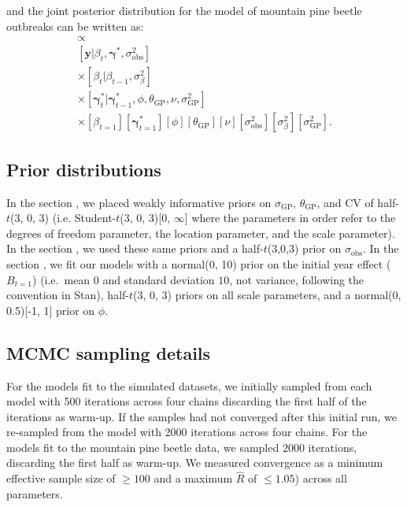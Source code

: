 \documentclass[12pt,english]{article}
\begin{document}
\begin{spacing}{1.4}
\noindent
and the joint posterior distribution
for the model of mountain pine beetle outbreaks can be written as:
\begin{multline}
  [
  \bm{\beta},
  \bm{\gamma}^*,
  \phi,
  \theta_{\mathrm{GP}},
  \nu,
  \sigma^2_{\mathrm{obs}},
  \sigma^2_{\beta},
  \sigma_{\mathrm{GP}}^2
  |
  \bm{y}]
  \propto \\
  [\bm{y} | \beta_{t}, \bm{\gamma}^*, \sigma^2_{\mathrm{obs}}] \\
  \times
  [\beta_t | \beta_{t-1}, \sigma^2_{\beta}] \\
  \times
  [\bm{\gamma}^*_{t} | \bm{\gamma}^*_{t-1}, \phi, \theta_{\mathrm{GP}}, \nu, \sigma_{\mathrm{GP}}^2] \\
  \times
  [\beta_{t=1}]
  [\bm{\gamma}^*_{t=1}]
  [\phi]
  [\theta_{\mathrm{GP}}]
  [\nu]
  [\sigma^2_{\mathrm{obs}}]
  [\sigma^2_{\beta}]
  [\sigma_{\mathrm{GP}}^2].
\end{multline}

\subsection{Prior distributions}

In the section \emph{}, we placed weakly
informative priors on $\sigma_{\mathrm{GP}}$, $\theta_{\mathrm{GP}}$, and CV of half-$t$(3, 0, 3) (i.e.
Student-$t$(3, 0, 3)[0, $\infty$] where the parameters in order refer to the
degrees of freedom parameter, the location parameter, and the scale parameter).
In the section \emph{}, we used these same priors and a
half-$t$(3,0,3) prior on $\sigma_{\mathrm{obs}}$. In the section
\emph{}, we fit our models with a normal(0, 10)
prior on the initial year effect ($B_{t=1}$) (i.e.\ mean $0$ and standard
  deviation $10$, not variance, following the convention in Stan), half-$t$(3,
0, 3) priors on all scale parameters, and a normal(0, 0.5)[-1, 1] prior on
$\phi$.

\subsection{MCMC sampling details}

For the models fit to the simulated datasets, we initially sampled from each
model with 500 iterations across four chains discarding the first half of the
iterations as warm-up. If the samples had not converged after this initial run,
we re-sampled from the model with 2000 iterations across four chains.
For the models fit to the mountain pine beetle data, we sampled
2000 iterations, discarding the first half as warm-up. We measured
convergence as a minimum effective sample size of $\ge 100$ and a maximum
$\hat{R}$ of $\le 1.05$) across all parameters.


\end{spacing}
\end{document}
